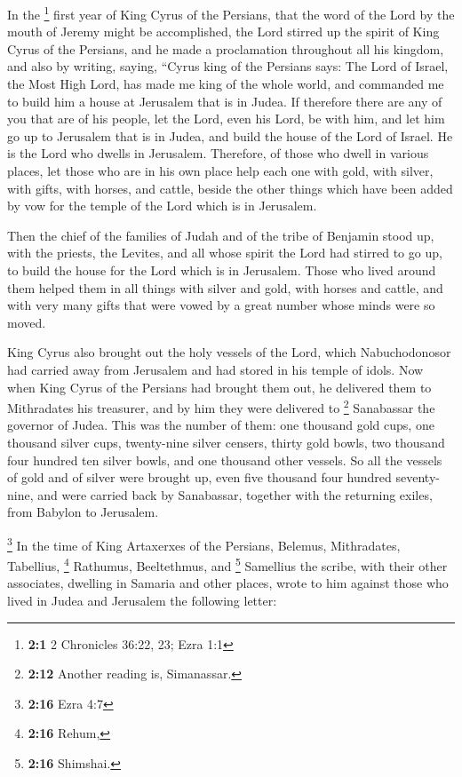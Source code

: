  In the \footnote{\textbf{2:1} 2 Chronicles 36:22, 23;
  Ezra 1:1} first year of King Cyrus of the Persians, that the word of
the Lord by the mouth of Jeremy might be accomplished, 
the Lord stirred up the spirit of King Cyrus of the Persians, and he
made a proclamation throughout all his kingdom, and also by writing,
 saying, ``Cyrus king of the Persians says: The Lord of
Israel, the Most High Lord, has made me king of the whole world,
 and commanded me to build him a house at Jerusalem that
is in Judea.  If therefore there are any of you that are
of his people, let the Lord, even his Lord, be with him, and let him go
up to Jerusalem that is in Judea, and build the house of the Lord of
Israel. He is the Lord who dwells in Jerusalem. 
Therefore, of those who dwell in various places, let those who are in
his own place help each one with gold, with silver,  with
gifts, with horses, and cattle, beside the other things which have been
added by vow for the temple of the Lord which is in Jerusalem.

 Then the chief of the families of Judah and of the tribe
of Benjamin stood up, with the priests, the Levites, and all whose
spirit the Lord had stirred to go up, to build the house for the Lord
which is in Jerusalem.  Those who lived around them helped
them in all things with silver and gold, with horses and cattle, and
with very many gifts that were vowed by a great number whose minds were
so moved.

 King Cyrus also brought out the holy vessels of the
Lord, which Nabuchodonosor had carried away from Jerusalem and had
stored in his temple of idols.  Now when King Cyrus of
the Persians had brought them out, he delivered them to Mithradates his
treasurer,  and by him they were delivered to \footnote{\textbf{2:12}
  Another reading is, Simanassar.} Sanabassar the governor of Judea.
 This was the number of them: one thousand gold cups, one
thousand silver cups, twenty-nine silver censers, thirty gold bowls, two
thousand four hundred ten silver bowls, and one thousand other vessels.
 So all the vessels of gold and of silver were brought
up, even five thousand four hundred seventy-nine,  and
were carried back by Sanabassar, together with the returning exiles,
from Babylon to Jerusalem.

 \footnote{\textbf{2:16} Ezra 4:7} In the time of King
Artaxerxes of the Persians, Belemus, Mithradates, Tabellius, \footnote{\textbf{2:16}
  Rehum,} Rathumus, Beeltethmus, and \footnote{\textbf{2:16} Shimshai.}
Samellius the scribe, with their other associates, dwelling in Samaria
and other places, wrote to him against those who lived in Judea and
Jerusalem the following letter:

